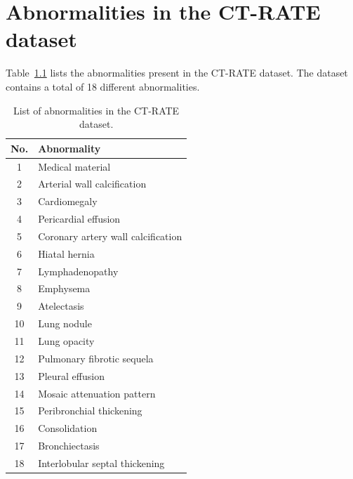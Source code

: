 \chapter{Abnormalities in the CT-RATE dataset}\label{app:ct-rate}

Table~\ref{tab:ctrate_abnormalities} lists the abnormalities present in the CT-RATE dataset.
The dataset contains a total of 18 different abnormalities.

\begin{table}[ht]
    \centering
    \begin{tabular}{cl}
        \hline
        \textbf{No.} & \textbf{Abnormality} \\
        \hline
        1  & Medical material \\
        2  & Arterial wall calcification \\
        3  & Cardiomegaly \\
        4  & Pericardial effusion \\
        5  & Coronary artery wall calcification \\
        6  & Hiatal hernia \\
        7  & Lymphadenopathy \\
        8  & Emphysema \\
        9  & Atelectasis \\
        10 & Lung nodule \\
        11 & Lung opacity \\
        12 & Pulmonary fibrotic sequela \\
        13 & Pleural effusion \\
        14 & Mosaic attenuation pattern \\
        15 & Peribronchial thickening \\
        16 & Consolidation \\
        17 & Bronchiectasis \\
        18 & Interlobular septal thickening \\
        \hline
    \end{tabular}
    \caption{List of abnormalities in the CT-RATE dataset.}
    \label{tab:ctrate_abnormalities}
\end{table}